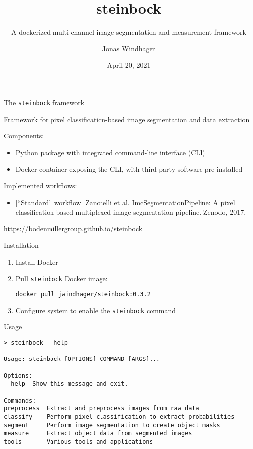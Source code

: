 \documentclass[aspectratio=169]{beamer}
\title{steinbock}
\subtitle{A dockerized multi-channel image segmentation and measurement framework}
\date{April 20, 2021}
\author{Jonas Windhager}
\begin{document}
\begin{frame}
\titlepage
\end{frame}


\begin{frame}{The \texttt{steinbock} framework}
	
	Framework for pixel classification-based image segmentation and data extraction
	
	\bigskip
	
	Components:
	\begin{itemize}
		\item Python package with integrated command-line interface (CLI)
		\item Docker container exposing the CLI, with third-party software pre-installed
	\end{itemize}

	\bigskip

	Implemented workflows:
	\begin{itemize}
		\item {[``Standard'' workflow]} Zanotelli et al. ImcSegmentationPipeline: A pixel classification-based multiplexed image segmentation pipeline. Zenodo, 2017.
	\end{itemize}

	\bigskip
	
	\href{https://bodenmillergroup.github.io/steinbock}{https://bodenmillergroup.github.io/steinbock}
	
\end{frame}


\begin{frame}[fragile]{Installation}

\begin{enumerate}
	\item Install Docker
	\bigskip
	\item Pull \texttt{steinbock} Docker image:\\
\begin{verbatim}
docker pull jwindhager/steinbock:0.3.2
\end{verbatim}
	\bigskip
	\item Configure system to enable the \texttt{steinbock} command
\end{enumerate}

\end{frame}


\begin{frame}[fragile]{Usage}
	
\begin{verbatim}
> steinbock --help

Usage: steinbock [OPTIONS] COMMAND [ARGS]...

Options:
--help  Show this message and exit.

Commands:
preprocess  Extract and preprocess images from raw data
classify    Perform pixel classification to extract probabilities
segment     Perform image segmentation to create object masks
measure     Extract object data from segmented images
tools       Various tools and applications
\end{verbatim}
	
\end{frame}
\end{document}
